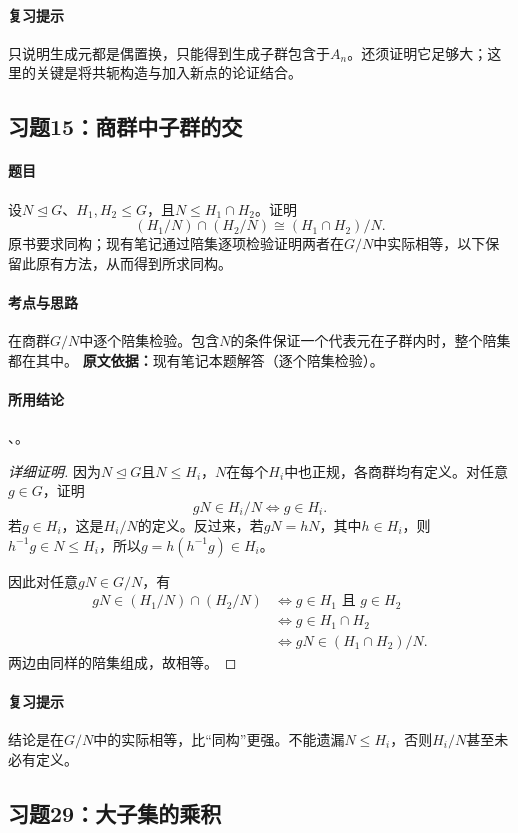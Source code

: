 \paragraph{复习提示}只说明生成元都是偶置换，只能得到生成子群包含于$A_n$。还须证明它足够大；这里的关键是将共轭构造与加入新点的论证结合。

\subsection{习题15：商群中子群的交}
\paragraph{题目}设$N\trianglelefteq G$、$H_1,H_2\le G$，且$N\le H_1\cap H_2$。证明
\[
(H_1/N)\cap(H_2/N)\cong(H_1\cap H_2)/N.
\]
原书要求同构；现有笔记通过陪集逐项检验证明两者在$G/N$中实际相等，以下保留此原有方法，从而得到所求同构。
\paragraph{考点与思路}在商群$G/N$中逐个陪集检验。包含$N$的条件保证一个代表元在子群内时，整个陪集都在其中。
\textbf{原文依据：}现有笔记本题解答（逐个陪集检验）。
\paragraph{所用结论}、。
\begin{proof}[详细证明]
因为$N\trianglelefteq G$且$N\le H_i$，$N$在每个$H_i$中也正规，各商群均有定义。对任意$g\in G$，证明
\[
gN\in H_i/N\iff g\in H_i.
\]
若$g\in H_i$，这是$H_i/N$的定义。反过来，若$gN=hN$，其中$h\in H_i$，则$h^{-1}g\in N\le H_i$，所以$g=h(h^{-1}g)\in H_i$。

因此对任意$gN\in G/N$，有
\begin{align*}
gN\in(H_1/N)\cap(H_2/N)
&\iff g\in H_1\text{ 且 }g\in H_2\\
&\iff g\in H_1\cap H_2\\
&\iff gN\in(H_1\cap H_2)/N.
\end{align*}
两边由同样的陪集组成，故相等。
\end{proof}
\paragraph{复习提示}结论是在$G/N$中的实际相等，比“同构”更强。不能遗漏$N\le H_i$，否则$H_i/N$甚至未必有定义。

\subsection{习题29：大子集的乘积}
